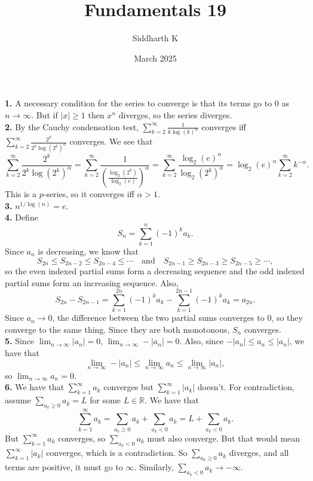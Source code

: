\documentclass{article}
\title{Fundamentals 19}
\author{Siddharth K}
\date{March 2025}
\newcommand{\R}{\mathbb{R}}
\begin{document}
\maketitle

\textbf{1.} A necessary condition for the series to converge is that its terms go to $0$ as $n \to \infty$. But if $|x| \ge 1$ then $x^n$ diverges, so the series diverges. \\

\textbf{2.} By the Cauchy condensation test, $\sum_{k = 2}^\infty \frac{1}{k\log(k)^\alpha}$ converges iff $\sum_{k = 2}^\infty \frac{2^k}{2^k\log(2^k)^\alpha}$ converges. We see that
$$\sum_{k = 2}^\infty \frac{2^k}{2^k\log(2^k)^\alpha} = \sum_{k = 2}^\infty \frac{1}{\left(\frac{\log_2(2^k)}{\log_2(e)}\right)^\alpha} = \sum_{k = 2}^\infty \frac{\log_2(e)^\alpha}{\log_2(2^k)^\alpha} = \log_2(e)^\alpha\sum_{k = 2}^\infty k^{-\alpha}.$$
This is a $p$-series, so it converges iff $\alpha > 1$. \\

\textbf{3.} $n^{1/\log(n)} = e$. \\

\textbf{4.} Define
$$S_n = \sum_{k = 1}^n (-1)^k a_k.$$
Since $a_n$ is decreasing, we know that
$$S_{2n} \le S_{2n - 2} \le S_{2n - 4} \le \cdots \quad \text{and} \quad S_{2n-1} \ge S_{2n - 3} \ge S_{2n - 5} \ge \cdots,$$
so the even indexed partial sums form a decreasing sequence and the odd indexed partial sums form an increasing sequence. Also,
$$S_{2n} - S_{2n - 1} = \sum_{k = 1}^{2n} (-1)^ka_k - \sum_{k = 1}^{2n - 1} (-1)^ka_k = a_{2n}.$$
Since $a_n \to 0$, the difference between the two partial sums converges to $0$, so they converge to the same thing. Since they are both monotonous, $S_n$ converges. \\

\textbf{5.} Since $\lim_{n \to \infty} |a_n| = 0$, $\lim_{n\to \infty} -|a_n| = 0$. Also, since $-|a_n| \le a_n \le |a_n|$, we have that
$$\lim_{n\to \infty} -|a_n| \le \lim_{n\to \infty} a_n \le \lim_{n\to \infty} |a_n|,$$
so $\lim_{n\to \infty} a_n = 0$. \\

\textbf{6.} We have that $\sum_{k = 1}^\infty a_k$ converges but $\sum_{k = 1}^\infty |a_k|$ doesn't. For contradiction, assume $\sum_{a_k \ge 0} a_k = L$ for some $L \in \R$. We have that
$$\sum_{k = 1}^\infty a_k = \sum_{a_k \ge 0} a_k + \sum_{a_k < 0} a_k = L + \sum_{a_k < 0} a_k.$$
But $\sum_{k = 1}^\infty a_k$ converges, so $\sum_{a_k < 0} a_k$ must also converge. But that would mean $\sum_{k = 1}^\infty |a_k|$ converges, which is a contradiction. So $\sum_{a_k \ge 0} a_k$ diverges, and all terms are positive, it must go to $\infty$. Similarly, $\sum_{a_k < 0} a_k \to -\infty$. \\
\end{document}
